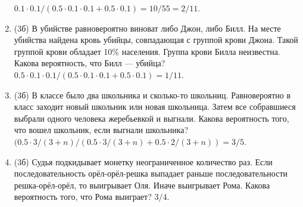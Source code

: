 \documentclass[a4paper, 12pt]{article}
\begin{document}
\begin{enumerate}
$0.1 \cdot 0.1 /(0.5 \cdot 0.1 \cdot 0.1 + 0.5 \cdot 0.1) = 10/55=2/11$.
\item (3б) В убийстве равновероятно виноват либо Джон, либо Билл. На месте убийства найдена кровь убийцы, совпадающая с группой крови Джона. 
Такой группой крови обладает 10\% населения. Группа крови Билла неизвестна. Какова вероятность, что Билл — убийца? $0.5 \cdot 0.1 \cdot 0.1 / 
(0.5 \cdot 0.1 \cdot 0.1 + 0.5 \cdot 0.1) = 1/11$.
\item (3б) В классе было два школьника и сколько-то школьниц. Равновероятно в класс заходит новый школьник или новая школьница. 
Затем все собравшиеся выбрали одного человека жеребьевкой и выгнали. Какова вероятность того, что вошел школьник, если выгнали школьника?
$(0.5 \cdot 3/(3+n) / (0.5 \cdot 3/(3+n) + 0.5 \cdot 2/(3+n)) = 3/5$.
\item (3б) Судья подкидывает монетку неограниченное количество раз. Если последовательность орёл-орёл-решка выпадает раньше
последовательности решка-орёл-орёл, то выигрывает Оля. Иначе выигрывает Рома. Какова вероятность того, что Рома выиграет?
$3/4$.
\end{enumerate}
\end{document}
